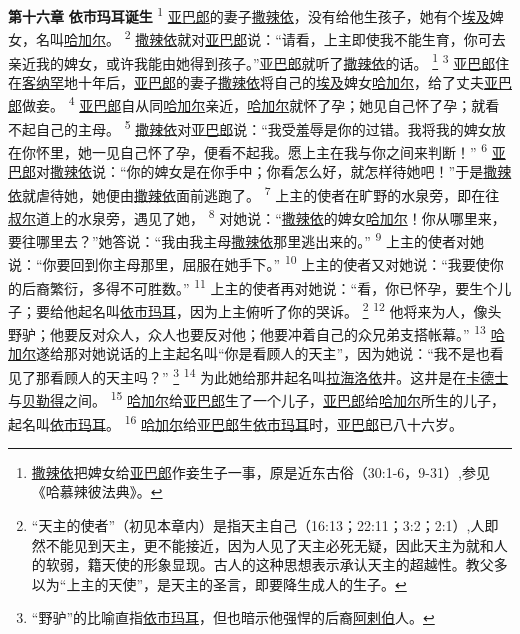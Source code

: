 \textbf{第十六章 }
\textbf{依市玛耳诞生 }
\textsuperscript{1}
\uline{亚巴郎}的妻子\uline{撒辣依}，没有给他生孩子，她有个\uline{埃及}婢女，名叫\uline{哈加尔}。
\textsuperscript{2}
\uline{撒辣依}就对\uline{亚巴郎}说：“请看，上主即使我不能生育，你可去亲近我的婢女，或许我能由她得到孩子。”\uline{亚巴郎}就听了\uline{撒辣依}的话。
\footnote{\uline{撒辣依}把婢女给\uline{亚巴郎}作妾生子一事，原是近东古俗（30:1-6，9-31）,参见《哈慕辣彼法典》。}
\textsuperscript{3}
\uline{亚巴郎}住在\uline{客纳罕}地十年后，\uline{亚巴郎}的妻子\uline{撒辣依}将自己的\uline{埃及}婢女\uline{哈加尔}，给了丈夫\uline{亚巴郎}做妾。
\textsuperscript{4}
\uline{亚巴郎}自从同\uline{哈加尔}亲近，\uline{哈加尔}就怀了孕；她见自己怀了孕；就看不起自己的主母。
\textsuperscript{5}
\uline{撒辣依}对\uline{亚巴郎}说：“我受羞辱是你的过错。我将我的婢女放在你怀里，她一见自己怀了孕，便看不起我。愿上主在我与你之间来判断！”
\textsuperscript{6}
\uline{亚巴郎}对\uline{撒辣依}说：“你的婢女是在你手中；你看怎么好，就怎样待她吧！”于是\uline{撒辣依}就虐待她，她便由\uline{撒辣依}面前逃跑了。
\textsuperscript{7}
上主的使者在旷野的水泉旁，即在往\uline{叔尔}道上的水泉旁，遇见了她，
\textsuperscript{8}
对她说：“\uline{撒辣依}的婢女\uline{哈加尔}！你从哪里来，要往哪里去？”她答说：“我由我主母\uline{撒辣依}那里逃出来的。”
\textsuperscript{9}
上主的使者对她说：“你要回到你主母那里，屈服在她手下。”
\textsuperscript{10}
上主的使者又对她说：“我要使你的后裔繁衍，多得不可胜数。”
\textsuperscript{11}
上主的使者再对她说：“看，你已怀孕，要生个儿子；要给他起名叫\uline{依市玛耳}，因为上主俯听了你的哭诉。
\footnote{“天主的使者”（初见本章内）是指天主自己（16:13；22:11；3:2；2:1）,人即然不能见到天主，更不能接近，因为人见了天主必死无疑，因此天主为就和人的软弱，籍天使的形象显现。古人的这种思想表示承认天主的超越性。教父多以为“上主的天使”，是天主的圣言，即要降生成人的生子。}
\textsuperscript{12}
他将来为人，像头野驴；他要反对众人，众人也要反对他；他要冲着自己的众兄弟支搭帐幕。”
\textsuperscript{13}
\uline{哈加尔}遂给那对她说话的上主起名叫“你是看顾人的天主”，因为她说：“我不是也看见了那看顾人的天主吗？”
\footnote{“野驴”的比喻直指\uline{依市玛耳}，但也暗示他强悍的后裔\uline{阿剌伯}人。}
\textsuperscript{14}
为此她给那井起名叫\uline{拉海}\uline{洛依}井。这井是在\uline{卡德士}与\uline{贝勒得}之间。
\textsuperscript{15}
\uline{哈加尔}给\uline{亚巴郎}生了一个儿子，\uline{亚巴郎}给\uline{哈加尔}所生的儿子，起名叫\uline{依市玛耳}。
\textsuperscript{16}
\uline{哈加尔}给\uline{亚巴郎}生\uline{依市玛耳}时，\uline{亚巴郎}已八十六岁。

